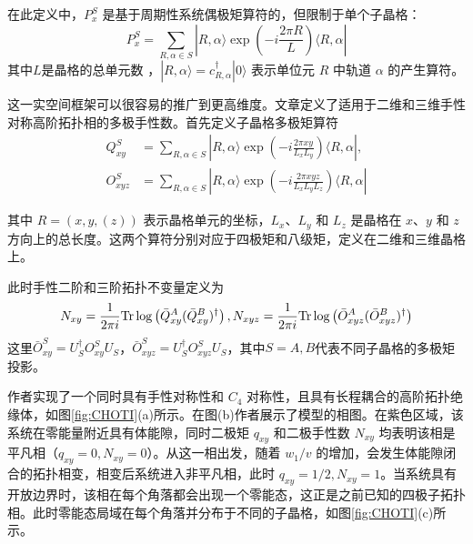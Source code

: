 在此定义中，\( P_x^S \) 是基于周期性系统偶极矩算符的，但限制于单个子晶格：
\begin{equation}
P_x^S = \sum_{R, \alpha \in S} |R, \alpha \rangle \exp\left( -i \frac{2\pi R}{L} \right) \langle R, \alpha |
\end{equation}
其中\( L \)是晶格的总单元数 ，\( |R, \alpha \rangle = c_{R,\alpha}^\dagger |0\rangle \) 表示单位元 \( R \) 中轨道 \( \alpha \) 的产生算符。

这一实空间框架可以很容易的推广到更高维度。文章定义了适用于二维和三维手性对称高阶拓扑相的多极手性数。首先定义子晶格多极矩算符
\begin{equation}
\begin{aligned}
Q_{xy}^S &= \sum_{R, \alpha \in S} |R, \alpha \rangle \exp \left( -i \frac{2\pi xy}{L_x L_y} \right) \langle R, \alpha |, \\
O_{xyz}^S &= \sum_{R, \alpha \in S} |R, \alpha \rangle \exp \left( -i \frac{2\pi xyz}{L_x L_y L_z} \right) \langle R, \alpha |
\end{aligned}
\end{equation}

其中 \( R = (x, y,(z)) \) 表示晶格单元的坐标，\( L_x \)、\( L_y \) 和 \( L_z \) 是晶格在 \( x \)、\( y \) 和 \( z \) 方向上的总长度。这两个算符分别对应于四极矩和八级矩，定义在二维和三维晶格上。

此时手性二阶和三阶拓扑不变量定义为
\begin{equation}
N_{xy} = \frac{1}{2\pi i} \mathrm{Tr} \log \left( \bar{Q}_{xy}^A (\bar{Q}_{xy}^B)^\dagger \right), \\
N_{xyz} = \frac{1}{2\pi i} \mathrm{Tr} \log \left( \bar{O}_{xyz}^A (\bar{O}_{xyz}^B)^\dagger \right)
\end{equation}
这里$\bar{O}_{xy}^S = U_S^\dagger O_{xy}^SU_S$，$\bar{O}_{xyz}^S = U_S^\dagger O_{xyz}^SU_S$，其中$S=A,B$代表不同子晶格的多极矩投影。

作者实现了一个同时具有手性对称性和 \( C_4 \) 对称性，且具有长程耦合的高阶拓扑绝缘体，如图\ref{fig:CHOTI}(a)所示。在图(b)作者展示了模型的相图。在紫色区域，该系统在零能量附近具有体能隙，同时二极矩 \( q_{xy} \) 和二极手性数 \( N_{xy} \) 均表明该相是平凡相（\( q_{xy} = 0, N_{xy} = 0 \)）。从这一相出发，随着 \( w_1/v \) 的增加，会发生体能隙闭合的拓扑相变，相变后系统进入非平凡相，此时 \( q_{xy} = 1/2, N_{xy} = 1 \)。当系统具有开放边界时，该相在每个角落都会出现一个零能态，这正是之前已知的四极子拓扑相。此时零能态局域在每个角落并分布于不同的子晶格，如图\ref{fig:CHOTI}(c)所示。

